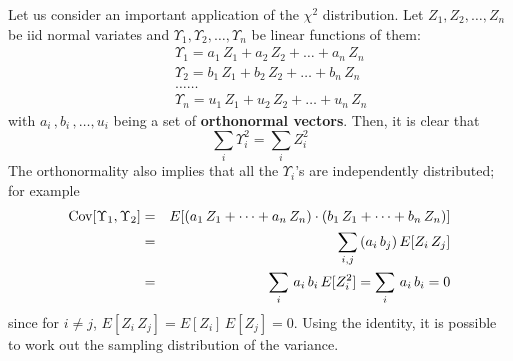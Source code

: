 \documentclass[aps,prl,preprint,superscriptaddress]{revtex4-1}
\begin{document}
\vspace{0.5cm}

Let us consider an important application of the $\chi^2$ distribution. Let $Z_1, Z_2, \dots, Z_n$ be iid normal
variates and $\Upsilon_1, \Upsilon_2, \dots, \Upsilon_n$ be linear functions of them:
%
\begin{eqnarray} 
&& \Upsilon_1 = a_1\, Z_1 + a_2\, Z_2 + \dots + a_n\, Z_n \nonumber\\
&& \Upsilon_2 = b_1\, Z_1 + b_2\, Z_2 + \dots + b_n\, Z_n \nonumber\\
&& \dots \dots \nonumber\\
&& \Upsilon_n = u_1\, Z_1 + u_2\, Z_2 + \dots + u_n\, Z_n 
\end{eqnarray}
%
with ${a_i\, , b_i\, , \dots , u_i}$ being a set of {\bf orthonormal vectors}. Then, it is clear that 
%
\begin{equation}
\sum_i \Upsilon_i^2 = \sum_i Z_i^2
\end{equation}
%
The orthonormality also implies that all the $\Upsilon_i$'s are independently distributed; for example
%
\begin{eqnarray}
{\rm Cov}[\Upsilon_1, \Upsilon_2] &=& E[(a_1\, Z_1 + \dots + a_n\, Z_n) \cdot (b_1\, Z_1 + \dots + b_n\, Z_n)] \nonumber\\
  &=& \sum_{i,j}\, (a_i\, b_j)\, E[Z_i\, Z_j] \nonumber\\
  &=& \sum_i\, a_i\, b_i\, E[Z_i^2] = \sum_i\, a_i\, b_i = 0
\end{eqnarray}
%
since for $i\neq j$, $E[Z_i\, Z_j] = E[Z_i]\, E[Z_j] = 0$.
Using the identity, it is possible to work out the sampling distribution of the variance.
\end{document}
